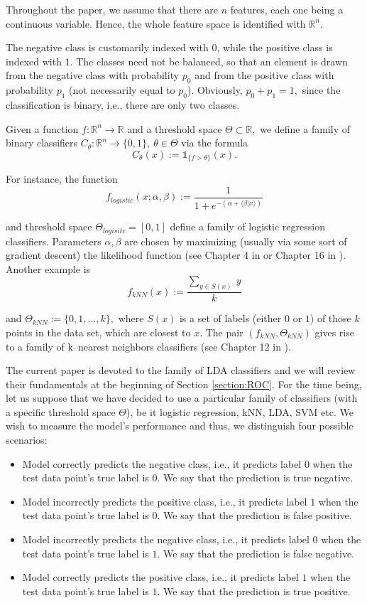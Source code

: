 \documentclass[10pt]{article}
\newcommand{\reals}{\mathbb{R}}
\begin{document}
\noindent
Throughout the paper, we assume that there are $n$ features, each one being a continuous variable. Hence, the whole feature space is identified with $\reals^n.$

The negative class is customarily indexed with $0$, while the positive class is indexed with $1$. The classes need not be balanced, so that an element is drawn from the negative class with probability $p_0$ and from the positive class with probability $p_1$ (not necessarily equal to $p_0$). Obviously, $p_0 + p_1 = 1,$ since the classification is binary, i.e., there are only two classes.

Given a function $f:\reals^n\longrightarrow \reals$ and a threshold space $\Theta\subset \reals,$ we define a family of binary classifiers $C_{\theta}:\reals^n\longrightarrow \{0,1\},\ \theta\in\Theta$ via the formula 
$$C_{\theta}(x) := \mathds{1}_{\{f > \theta\}}(x).$$

\noindent
For instance, the function 
$$f_{logistic}(x; \alpha,\beta) := \frac{1}{1+e^{-(\alpha + \langle \beta|x\rangle)}}$$

\noindent
and threshold space $\Theta_{logisitc} = [0,1]$ define a family of logistic regression classifiers. Parameters $\alpha,\beta$ are chosen by maximizing (usually via some sort of gradient descent) the likelihood function (see Chapter 4 in \cite{Geron} or Chapter 16 in \cite{Grus}). Another example is 
$$f_{kNN}(x) := \frac{\sum_{y \in S(x)}\ y}{k}$$

\noindent
and $\Theta_{kNN} := \{0,1,\ldots,k\},$ where $S(x)$ is a set of labels (either $0$ or $1$) of those $k$ points in the data set, which are closest to $x$. The pair $(f_{kNN}, \Theta_{kNN})$ gives rise to a family of k--nearest neighbors classifiers (see Chapter 12 in \cite{Grus}). 

The current paper is devoted to the family of LDA classifiers and we will review their fundamentals at the beginning of Section \ref{section:ROC}. For the time being, let us suppose that we have decided to use a particular family of classifiers (with a specific threshold space $\Theta$), be it logistic regression, kNN, LDA, SVM etc. We wish to measure the model's performance and thus, we distinguish four possible scenarios: 
\begin{itemize}
	\item Model correctly predicts the negative class, i.e., it predicts label $0$ when the test data point's true label is $0$. We say that the prediction is true negative. 
	\item Model incorrectly predicts the positive class, i.e., it predicts label $1$ when the test data point's true label is $0$. We say that the prediction is false positive.
	\item Model incorrectly predicts the negative class, i.e., it predicts label $0$ when the test data point's true label is $1$. We say that the prediction is false negative.
	\item Model correctly predicts the positive class, i.e., it predicts label $1$ when the test data point's true label is $1$. We say that the prediction is true positive.
\end{itemize}
\end{document}
